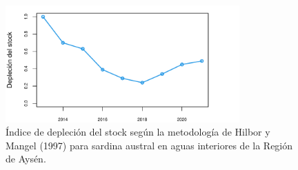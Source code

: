 \documentclass[
  spanish,
]{article}
\begin{document}
\begin{figure}[h!]
\centering
\includegraphics[width=0.8\textwidth]{Figuras/Fig10_InformeFinal-1.pdf}
\caption{Índice de depleción del stock según la metodología de Hilbor y Mangel (1997) para sardina austral en aguas interiores de la Región de Aysén.}
\label{Fig10}
\end{figure}

\vspace{0.5cm}
\end{document}
